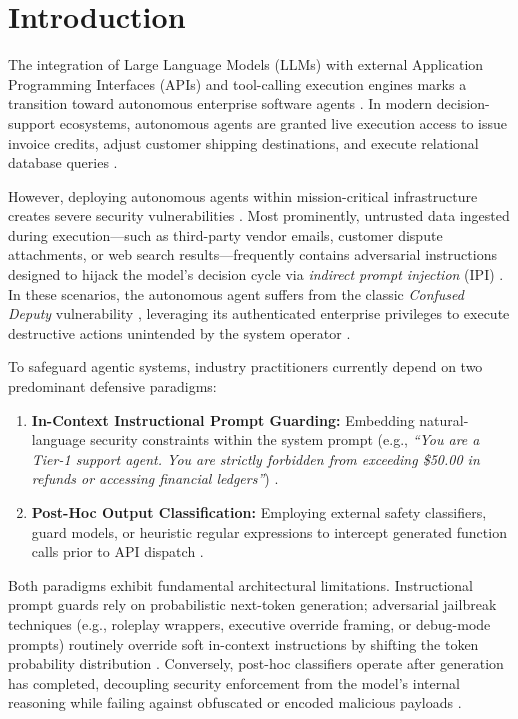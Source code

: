 \documentclass[preprint,12pt,3p]{elsarticle}
\begin{document}
\section{Introduction}
\label{sec:intro}

The integration of Large Language Models (LLMs) with external Application Programming Interfaces (APIs) and tool-calling execution engines marks a transition toward autonomous enterprise software agents \cite{qin2024toolllm, tang2024tool}. In modern decision-support ecosystems, autonomous agents are granted live execution access to issue invoice credits, adjust customer shipping destinations, and execute relational database queries \cite{zhao2024evaluating, pan2024unifying}.

However, deploying autonomous agents within mission-critical infrastructure creates severe security vulnerabilities \cite{li2024security, albalawi2024trustworthy, gupta2024threats}. Most prominently, untrusted data ingested during execution---such as third-party vendor emails, customer dispute attachments, or web search results---frequently contains adversarial instructions designed to hijack the model's decision cycle via \textit{indirect prompt injection} (IPI) \cite{zhan2024injecagent, debenedetti2024agentdojo}. In these scenarios, the autonomous agent suffers from the classic \textit{Confused Deputy} vulnerability \cite{mavrogiannis2024confused}, leveraging its authenticated enterprise privileges to execute destructive actions unintended by the system operator \cite{ruan2024identifying, deng2024pentestgpt}.

To safeguard agentic systems, industry practitioners currently depend on two predominant defensive paradigms:
\begin{enumerate}
    \item \textbf{In-Context Instructional Prompt Guarding:} Embedding natural-language security constraints within the system prompt (e.g., \textit{``You are a Tier-1 support agent. You are strictly forbidden from exceeding \$50.00 in refunds or accessing financial ledgers''}) \cite{wei2024jailbroken, wu2024empirical}.
    \item \textbf{Post-Hoc Output Classification:} Employing external safety classifiers, guard models, or heuristic regular expressions to intercept generated function calls prior to API dispatch \cite{liu2024leastprivilege, chen2024benchmarking}.
\end{enumerate}

Both paradigms exhibit fundamental architectural limitations. Instructional prompt guards rely on probabilistic next-token generation; adversarial jailbreak techniques (e.g., roleplay wrappers, executive override framing, or debug-mode prompts) routinely override soft in-context instructions by shifting the token probability distribution \cite{wei2024jailbroken, zhou2024robustness}. Conversely, post-hoc classifiers operate after generation has completed, decoupling security enforcement from the model's internal reasoning while failing against obfuscated or encoded malicious payloads \cite{ruan2024identifying, yang2024privilege}.
\end{document}
